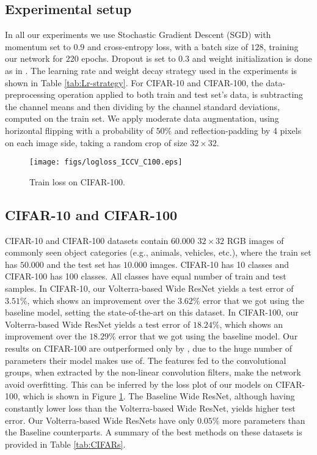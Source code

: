 \documentclass[10pt,twocolumn,letterpaper]{article}
\begin{document}
\subsection{Experimental setup}

In all our experiments we use Stochastic Gradient Descent (SGD) with momentum set to $0.9$ and cross-entropy loss, with a batch size of $128$, training our network for 220 epochs. Dropout is set to $0.3$ and weight initialization is done as in \cite{He15}. The learning rate and weight decay strategy used in the experiments is shown in Table \ref{tab:Lr-strategy}. For CIFAR-10 and CIFAR-100, the data-preprocessing operation applied to both train and test set's data, is subtracting the channel means and then dividing by the channel standard deviations, computed on the train set. We apply moderate data augmentation, using horizontal flipping with a probability of $50\%$ and reflection-padding by 4 pixels on each image side, taking a random crop of size $32\times32$.


\begin{figure}[b]
	    \hspace{-0.75cm}
	    \texttt{[image: figs/logloss\_ICCV\_C100.eps]}
	    \caption{Train loss on CIFAR-100.}\label{fig:CIFAR100-loss}
\end{figure}
\subsection{CIFAR-10 and CIFAR-100}

CIFAR-10 and CIFAR-100 datasets contain $60.000$ $32\times32$ RGB images of commonly seen object categories (e.g., animals, vehicles, etc.), where the train set has $50.000$ and the test set has $10.000$ images. CIFAR-10 has 10 classes and CIFAR-100 has 100 classes. All classes have equal number of train and test samples. In CIFAR-10, our Volterra-based Wide ResNet yields a test error of $3.51\%$, which shows an improvement over the $3.62\%$ error that we got using the baseline model, setting the state-of-the-art on this dataset. In CIFAR-100, our Volterra-based Wide ResNet yields a test error of $18.24\%$, which shows an improvement over the $18.29\%$ error that we got using the baseline model. Our results on CIFAR-100 are outperformed only by \cite{ResNeXt16}, due to the huge number of parameters their model makes use of. The features fed to the convolutional groups, when extracted by the non-linear convolution filters, make the network avoid overfitting. This can be inferred by the loss plot of our models on CIFAR-100, which is shown in Figure \ref{fig:CIFAR100-loss}. The Baseline Wide ResNet, although having constantly lower loss than the Volterra-based Wide ResNet, yields higher test error. Our Volterra-based Wide ResNets have only $0.05\%$ more parameters than the Baseline counterparts.
A summary of the best methods on these datasets is provided in Table \ref{tab:CIFARs}.
\end{document}
